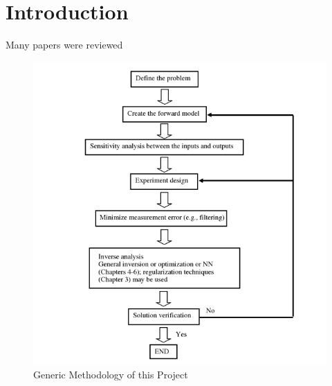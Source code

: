 \section{Introduction}
Many papers were reviewed  


\begin{figure}
\begin{center}
\includegraphics[scale=1]
{images/chapter_2/mthodology_generic.png}
\caption{Generic Methodology of this Project}
\end{center}
\end{figure}